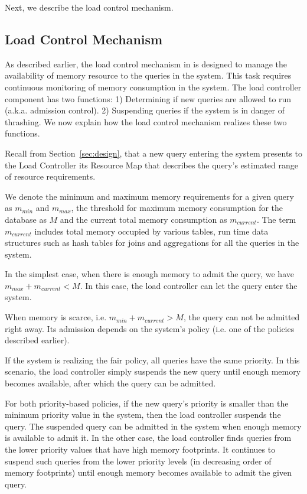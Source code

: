 Next, we describe the load control mechanism. %
\subsection{Load Control Mechanism}\label{ssec:load-control-mech}
As described earlier, the load control mechanism in \sys{} is designed to manage the availability of memory resource to the queries in the system.
This task requires continuous monitoring of memory consumption in the system.
The load controller component has two functions:
1) Determining if new queries are allowed to run (a.k.a. admission control).
2) Suspending queries if the system is in danger of thrashing.
We now explain how the load control mechanism realizes these two functions.


Recall from Section~\ref{sec:design}, that a new query entering the system presents to the Load Controller its Resource Map that describes the query's estimated range of resource requirements.

We denote the minimum and maximum memory requirements for a given query as $m_{min}$ and $m_{max}$, the threshold for maximum memory consumption for the database as $M$ and the current total memory consumption as $m_{current}$. 
The term $m_{current}$ includes total memory occupied by various tables, run time data structures such as hash tables for joins and aggregations for all the queries in the system.

In the simplest case, when there is enough memory to admit the query, we have $m_{max} + m_{current} < M$. 
In this case, the load controller can let the query enter the system.

When memory is scarce, i.e. $m_{min}+m_{current}>M$, the query can not be admitted right away. 
Its admission depends on the system's policy (i.e. one of the policies described earlier).

If the system is realizing the fair policy, all queries have the same priority.
In this scenario, the load controller simply suspends the new query until enough memory becomes available, after which the query can be admitted.

For both priority-based policies, if the new query's priority is smaller than the minimum priority value in the system, then the load controller suspends the query. 
The suspended query can be admitted in the system when enough memory is available to admit it.
In the other case, the load controller finds queries from the lower priority values that have high memory footprints. 
It continues to suspend such queries from the lower priority levels (in decreasing order of memory footprints) until enough memory becomes available to admit the given query. 

